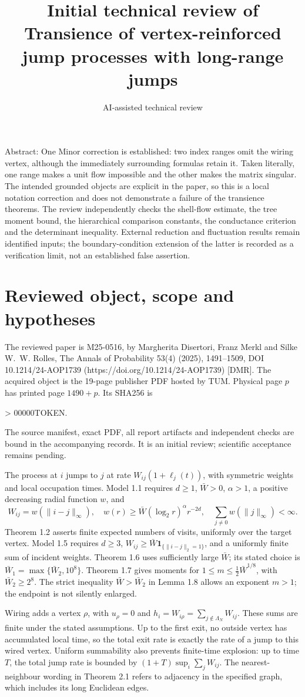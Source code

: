 \documentclass[10pt]{article}
\title{Initial technical review of
Transience of vertex-reinforced jump processes
with long-range jumps}
\author{AI-assisted technical review}
\date{}
\begin{document}
\maketitle
Abstract: One Minor correction is established: two index ranges omit the wiring vertex, although the immediately surrounding formulas retain it. Taken literally, one range makes a unit flow impossible and the other makes the matrix singular. The intended grounded objects are explicit in the paper, so this is a local notation correction and does not demonstrate a failure of the transience theorems. The review independently checks the shell-flow estimate, the tree moment bound, the hierarchical comparison constants, the conductance criterion and the determinant inequality. External reduction and fluctuation results remain identified inputs; the boundary-condition extension of the latter is recorded as a verification limit, not an established false assertion.\par
\section*{Reviewed object, scope and hypotheses}
The reviewed paper is M25-0516, by Margherita Disertori, Franz Merkl and Silke W. W. Rolles, The Annals of Probability 53(4) (2025), 1491–1509, DOI 10.1214/24-AOP1739 (https://doi.org/10.1214/24-AOP1739) [DMR]. The acquired object is the 19-page publisher PDF hosted by TUM. Physical page \(p\) has printed page \(1490+p\). Its SHA256 is\par
> 00000TOKEN.\par
The source manifest, exact PDF, all report artifacts and independent checks are bound in the accompanying records. It is an initial review; scientific acceptance remains pending.\par
The process at \(i\) jumps to \(j\) at rate \(W_{ij}(1+\ell_j(t))\), with symmetric weights and local occupation times. Model 1.1 requires \(d\geq1\), \(\bar W>0\), \(\alpha>1\), a positive decreasing radial function \(w\), and \[W_{ij}=w(\|i-j\|_\infty),\quad
 w(r)\geq \bar W(\log_2 r)^\alpha r^{-2d},\quad
 \sum_{j\ne0}w(\|j\|_\infty)<\infty .\] Theorem 1.2 asserts finite expected numbers of visits, uniformly over the target vertex. Model 1.5 requires \(d\geq3\), \(W_{ij}\geq\bar W\mathbf1_{\{\|i-j\|_2=1\}}\), and a uniformly finite sum of incident weights. Theorem 1.6 uses sufficiently large \(\bar W\); its stated choice is \(\bar W_1=\max\{\bar W_2,10^8\}\). Theorem 1.7 gives moments for \(1\leq m\leq\tfrac12\bar W^{1/8}\), with \(\bar W_2\geq2^8\). The strict inequality \(\bar W>\bar W_2\) in Lemma 1.8 allows an exponent \(m>1\); the endpoint is not silently enlarged.\par
Wiring adds a vertex \(\rho\), with \(u_\rho=0\) and \(h_i=W_{i\rho}=\sum_{j\notin\Lambda_N}W_{ij}\). These sums are finite under the stated assumptions. Up to the first exit, no outside vertex has accumulated local time, so the total exit rate is exactly the rate of a jump to this wired vertex. Uniform summability also prevents finite-time explosion: up to time \(T\), the total jump rate is bounded by \((1+T)\sup_i\sum_jW_{ij}\). The nearest-neighbour wording in Theorem 2.1 refers to adjacency in the specified graph, which includes its long Euclidean edges.\par
\end{document}

